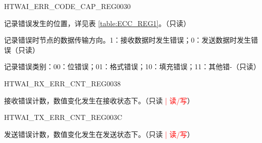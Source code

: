 \begin{register}{H}{TWAI\_ERR\_CODE\_CAP\_REG}{\hexprefix{}0030}\label{regdesc:TWAIERRCODECAPREG}
%
%
%
%
\regnewline%
\begin{regdesc}\begin{reglist}
\label{fielddesc:TWAIECCSEGMENT}\item [TWAI\_ECC\_SEGMENT] 记录错误发生的位置，详见表 \ref{table:ECC_REG1}。（只读）
\label{fielddesc:TWAIECCDIRECTION}\item [TWAI\_ECC\_DIRECTION] 记录错误时节点的数据传输方向。1：接收数据时发生错误；0：发送数据时发生错误（只读）
\label{fielddesc:TWAIECCTYPE}\item [TWAI\_ECC\_TYPE] 记录错误类别：00：位错误；01：格式错误；10：填充错误；11：其他错-（只读）
\end{reglist}\end{regdesc}
\end{register}


\begin{register}{H}{TWAI\_RX\_ERR\_CNT\_REG}{\hexprefix{}0038}\label{regdesc:TWAIRXERRCNTREG}
%
%
\regnewline%
\begin{regdesc}\begin{reglist}
\label{fielddesc:TWAIRXERRCNT}\item [TWAI\_RX\_ERR\_CNT] 接收错误计数，数值变化发生在接收状态下。（只读 \textcolor{red}{| 读/写}）
\end{reglist}\end{regdesc}
\end{register}


\begin{register}{H}{TWAI\_TX\_ERR\_CNT\_REG}{\hexprefix{}003C}\label{regdesc:TWAITXERRCNTREG}
%
%
\regnewline%
\begin{regdesc}\begin{reglist}
\label{fielddesc:TWAITXERRCNT}\item [TWAI\_TX\_ERR\_CNT] 发送错误计数，数值变化发生在发送状态下。（只读 \textcolor{red}{| 读/写}）
\end{reglist}\end{regdesc}
\end{register}


